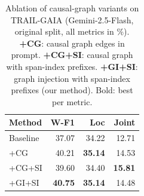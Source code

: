 
\begin{table}[t]
\centering
\small
\setlength{\tabcolsep}{6pt}
\renewcommand{\arraystretch}{1.2}
\begin{tabular}{l rrr}
\toprule
\textbf{Method} & \textbf{W-F1} & \textbf{Loc} & \textbf{Joint} \\
\midrule
Baseline         & 37.07 & 34.22 & 12.71 \\
+CG              & 40.21 & \textbf{35.14} & 14.53 \\
+CG+SI           & 39.60 & 34.40 & \textbf{15.81} \\
+GI+SI           & \textbf{40.75} & \textbf{35.14} & 14.48 \\
\bottomrule
\end{tabular}
\caption{%
  Ablation of causal-graph variants on TRAIL-GAIA
  (Gemini-2.5-Flash, original split, all metrics in \%).
  \textbf{+CG}: causal graph edges in prompt.
  \textbf{+CG+SI}: causal graph with span-index prefixes.
  \textbf{+GI+SI}: graph injection with span-index prefixes (our method).
  Bold: best per metric.%
}
\label{tab:ablation_methods_baseline}
\end{table}




